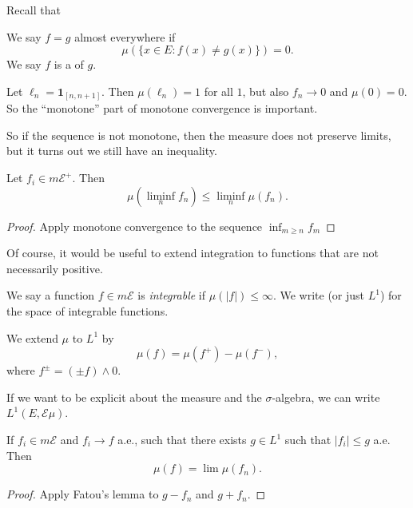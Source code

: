 \documentclass[a4paper]{article}
\begin{document}
Recall that
\begin{defi}
  We say $f = g$ almost everywhere if
  \[
    \mu(\{x \in E: f(x) \not= g(x)\}) = 0.
  \]
  We say $f$ is a  of $g$.
\end{defi}

\begin{eg}
  Let $\ell_n = \mathbf{1}_{[n, n + 1]}$. Then $\mu(\ell_n) = 1$ for all $1$, but also $f_n \to 0$ and $\mu(0) = 0$. So the ``monotone'' part of monotone convergence is important.
\end{eg}

So if the sequence is not monotone, then the measure does not preserve limits, but it turns out we still have an inequality.

\begin{lemma}
  Let $f_i \in m \mathcal{E}^+$. Then
  \[
    \mu\left(\liminf_n f_n\right) \leq \liminf_n \mu(f_n).
  \]
\end{lemma}

\begin{proof}
  Apply monotone convergence to the sequence $\inf_{m \geq n} f_m$
\end{proof}

Of course, it would be useful to extend integration to functions that are not necessarily positive.
\begin{defi}
  We say a function $f \in m\mathcal{E}$ is \emph{integrable} if $\mu(|f|) \leq \infty$. We write  (or just $L^1$) for the space of integrable functions.

  We extend $\mu$ to $L^1$ by
  \[
    \mu(f) = \mu(f^+) - \mu(f^-),
  \]
  where $f^{\pm} = (\pm f) \wedge 0$.
\end{defi}

If we want to be explicit about the measure and the $\sigma$-algebra, we can write $L^1(E, \mathcal{E} \mu)$.

\begin{thm}
  If $f_i \in m\mathcal{E}$ and $f_i \to f$ a.e., such that there exists $g \in L^1$ such that $|f_i| \leq g$ a.e. Then
  \[
    \mu(f) = \lim \mu(f_n).
  \]
\end{thm}

\begin{proof}
  Apply Fatou's lemma to $g - f_n$ and $g + f_n$.
\end{proof}
\end{document}
